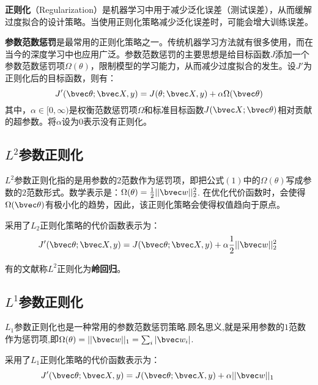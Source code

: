 
\begin{issues}
\issueMissDepend
\issueNeedCite
\end{issues}


\textbf{正则化}（Regularization）是机器学习中用于减少泛化误差（测试误差），从而缓解过度拟合的设计策略。当使用正则化策略减少泛化误差时，可能会增大训练误差。

\textbf{参数范数惩罚}是最常用的正则化策略之一。传统机器学习方法就有很多使用，而在当今的深度学习中也应用广泛。参数范数惩罚的主要思想是给目标函数$J$添加一个参数范数惩罚项$\Omega(\theta)$，限制模型的学习能力，从而减少过度拟合的发生。设$J'$为正则化后的目标函数，则有：
\begin{equation}
J'(\bvec \theta;\bvec X,y)=J(\theta;\bvec X,y)+\alpha\Omega(\bvec \theta)
\end{equation}
其中，$\alpha\in[0,\infty)$是权衡范数惩罚项$\Omega$和标准目标函数$J(\bvec X;\bvec \theta)$相对贡献的超参数。将$\alpha$设为$0$表示没有正则化。


\subsection{$L^2$参数正则化}

$L^2$参数正则化指的是用参数的$2$范数作为惩罚项，即把公式$(1)$中的$\Omega(\theta)$写成参数的$2$范数形式。数学表示是：$\Omega(\theta)=\frac{1}{2}||\bvec w||_2^2$.
在优化代价函数时，会使得$\Omega(\bvec \theta)$有极小化的趋势，因此，该正则化策略会使得权值趋向于原点。

采用了$L_2$正则化策略的代价函数表示为：
\begin{equation}
J'(\bvec \theta;\bvec X,y)=J(\bvec \theta;\bvec X,y)+\alpha\frac{1}{2}||\bvec w||_2^2~
\end{equation}

有的文献称$L^2$正则化为\textbf{岭回归}。


\subsection{$L^1$参数正则化}

$L_1$参数正则化也是一种常用的参数范数惩罚策略.顾名思义,就是采用参数的$1$范数作为惩罚项,即$\Omega(\theta)=||\bvec w||_1=\sum_i|\bvec w_i|$.

采用了$L_1$正则化策略的代价函数表示为：
\begin{equation}
J'(\bvec \theta;\bvec X,y)=J(\bvec \theta;\bvec X,y)+\alpha||\bvec w||_1~
\end{equation}


